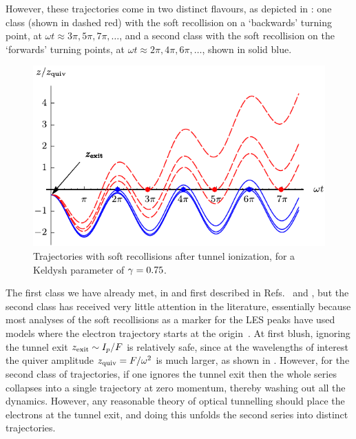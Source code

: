 However, these trajectories come in two distinct flavours, as depicted in : one class (shown in dashed red) with the soft recollision on a `backwards' turning point, at $\omega t\approx 3\pi, 5\pi, 7\pi, \ldots$, and a second class with the soft recollision on the `forwards' turning points, at $\omega t\approx 2\pi, 4\pi, 6\pi, \ldots$, shown in solid blue.



\begin{figure}[ht]
  \centering
  \includegraphics[width=0.6\columnwidth]{6-LES/Figures/figure6-2D.pdf}
  \caption[
  Trajectories with soft recollisions, both on the backwards swing and the forwards turning point
  ]{
  Trajectories with soft recollisions after tunnel ionization, for a Keldysh parameter of  $\gamma=0.75$.}
  \label{f6-trajectories-at-transitions}
\end{figure}

The first class we have already met, in  and first described in Refs.~\citealp{Rost_PRL} and \citealp{Rost_JPhysB}, but the second class has received very little attention in the literature, essentially because most analyses of the soft recollisions as a marker for the LES peaks have used models where the electron trajectory starts at the origin~\cite{Becker_rescattering}. At first blush, ignoring the tunnel exit $z_\mathrm{exit}\sim I_p/F$ is relatively safe, since at the wavelengths of interest the quiver amplitude $z_\mathrm{quiv}=F/\omega^2$ is much larger, as shown in . However, for the second class of trajectories, if one ignores the tunnel exit then the whole series collapses into a single trajectory at zero momentum, thereby washing out all the dynamics. However, any reasonable theory of optical tunnelling should place the electrons at the tunnel exit, and doing this unfolds the second series into distinct trajectories.

